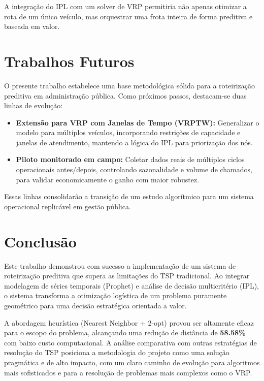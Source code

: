 \documentclass[11pt,a4paper,twocolumn]{article}
\begin{document}
A integração do IPL com um solver de VRP permitiria não apenas otimizar a rota de um único veículo, mas orquestrar uma frota inteira de forma preditiva e baseada em valor.

\section{Trabalhos Futuros}

O presente trabalho estabelece uma base metodológica sólida para a roteirização preditiva em administração pública. Como próximos passos, destacam-se duas linhas de evolução:

\begin{itemize}
    \item \textbf{Extensão para VRP com Janelas de Tempo (VRPTW):} Generalizar o modelo para múltiplos veículos, incorporando restrições de capacidade e janelas de atendimento, mantendo a lógica do IPL para priorização dos nós.
    \item \textbf{Piloto monitorado em campo:} Coletar dados reais de múltiplos ciclos operacionais antes/depois, controlando sazonalidade e volume de chamados, para validar economicamente o ganho com maior robustez.
\end{itemize}

Essas linhas consolidarão a transição de um estudo algorítmico para um sistema operacional replicável em gestão pública.

\section{Conclusão}

Este trabalho demonstrou com sucesso a implementação de um sistema de roteirização preditiva que supera as limitações do TSP tradicional. Ao integrar modelagem de séries temporais (Prophet) e análise de decisão multicritério (IPL), o sistema transforma a otimização logística de um problema puramente geométrico para uma decisão estratégica orientada a valor.

A abordagem heurística (Nearest Neighbor + 2-opt) provou ser altamente eficaz para o escopo do problema, alcançando uma redução de distância de \textbf{58.58\%} com baixo custo computacional. A análise comparativa com outras estratégias de resolução do TSP posiciona a metodologia do projeto como uma solução pragmática e de alto impacto, com um claro caminho de evolução para algoritmos mais sofisticados e para a resolução de problemas mais complexos como o VRP.
\end{document}
